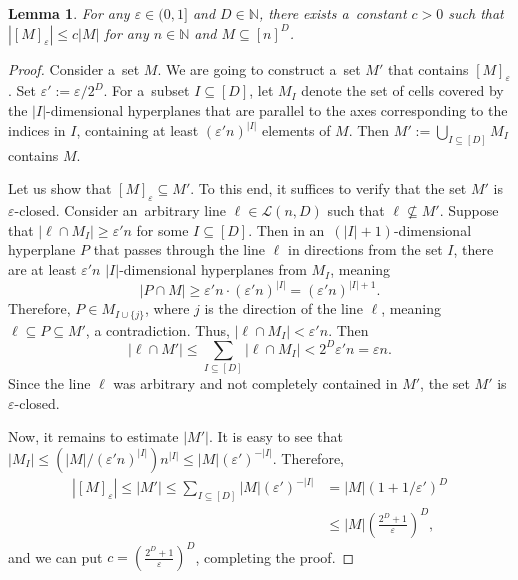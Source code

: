 \documentclass[conference]{IEEEtran}
\newcommand{\rbr}[1]{\left(#1\right)}
\let\le\leqslant
\let\ge\geqslant
\newcommand{\eps}{\varepsilon}
\theoremstyle{plain}
\newtheorem{lemma}[theorem]{Lemma}
\theoremstyle{definition}
\theoremstyle{remark}
\newcommand{\NN}{\mathbb{N}}
\newcommand{\cL}{\mathcal{L}}
\begin{document}
\begin{lemma}\label{lemma:closure-size}
 For any $\eps\in (0,1]$ and $D\in\NN$, there exists a~constant $c>0$ such that $|[M]_\eps|\le c|M|$ for any $n\in\NN$ and $M\subseteq [n]^D$.
\end{lemma}
\begin{proof}
 Consider a~set $M$. We are going to construct a~set $M'$ that contains $[M]_\eps$. Set $\eps':=\eps/2^D$. For a~subset $I\subseteq [D]$, let $M_I$ denote the set of cells covered by the $|I|$-dimensional hyperplanes that are parallel to the axes corresponding to the indices in $I$, containing at least $(\eps' n)^{|I|}$ elements of $M$. Then $M':=\bigcup_{I\subseteq [D]} M_I$ contains $M$. 
 
 Let us show that $[M]_\eps\subseteq M'$. To this end, it suffices to verify that the set $M'$ is $\eps$-closed. Consider an~arbitrary line $\ell\in \cL(n,D)$ such that $\ell\not\subseteq M'$. Suppose that $|\ell\cap M_I|\ge \eps'n$ for some $I\subseteq [D]$. Then in an~$(|I|+1)$-dimensional hyperplane $P$ that passes through the line $\ell$ in directions from the set $I$, there are at least $\eps'n$ $|I|$-dimensional hyperplanes from $M_I$, meaning \[
    |P\cap M|\ge \eps'n\cdot (\eps' n)^{|I|}=(\eps' n)^{|I|+1}.
\]
Therefore, $P\in M_{I\cup\{j\}}$, where $j$ is the direction of the line $\ell$, meaning $\ell\subseteq P\subseteq M'$, a contradiction. Thus, $|\ell\cap M_I|<\eps'n$. Then \[
    |\ell\cap M'|\le\sum_{I\subseteq [D]}|\ell\cap M_I|< 2^D\eps'n=\eps n.
\]
Since the line $\ell$ was arbitrary and not completely contained in $M'$, the set $M'$ is $\eps$-closed.
 
 Now, it remains to estimate $|M'|$. It is easy to see that $|M_I|\le (|M|/(\eps'n)^{|I|}) n^{|I|}\le |M|(\eps')^{-|I|}$. Therefore, 
 \begin{align*}
 |[M]_\eps|\le |M'|\le\sum_{I\subseteq [D]}|M|(\eps')^{-|I|}&=|M|(1+1/\eps')^D\\
 &\le |M|\rbr{\frac{2^D+1}{\eps}}^{D},
 \end{align*}
 and we can put $c=\rbr{\frac{2^D+1}{\eps}}^{D}$, completing the proof.
\end{proof}
\end{document}
